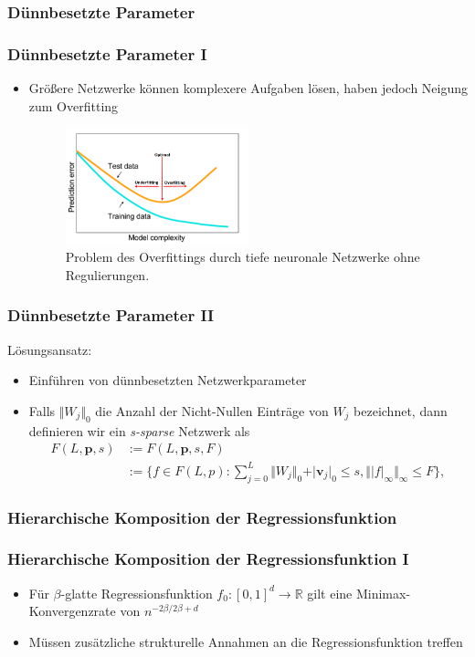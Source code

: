 \documentclass[hyperref={pdfpagelabels=false}]{beamer}
\begin{document}
\subsubsection{Dünnbesetzte Parameter}
\begin{frame}
\frametitle{Dünnbesetzte Parameter \RN{1}}
\begin{itemize}
\item Größere Netzwerke können komplexere Aufgaben lösen, haben jedoch Neigung zum Overfitting \bigskip
\begin{figure}[h]
  \centering
  \includegraphics[width=0.5\textwidth]{Bilder/overfitting.pdf}
  \caption[Caption for LOF]{Problem des Overfittings durch tiefe neuronale Netzwerke ohne Regulierungen.}
\end{figure}
\end{itemize}

\end{frame}

\begin{frame}
\frametitle{Dünnbesetzte Parameter \RN{2}}
Lösungsansatz:
\begin{itemize}
\item Einführen von dünnbesetzten Netzwerkparameter
\item Falls $\Vert W_j \Vert _0$ die Anzahl der Nicht-Nullen Einträge von $W_j$ bezeichnet, dann definieren wir ein \textit{s-sparse} Netzwerk als 
\begin{equation*} 
\begin{split}
F(L,\textbf{p},s) &:= F(L,\textbf{p}, s, F) \\
                 &:= \{ f \in F(L,p): \sum_{j=0}^L \Vert W_j \Vert _0+ \vert \mathbf{v}_j \vert _0\leq s , \Vert \vert f \vert _\infty \Vert _\infty \leq F\}, 
\end{split}
\end{equation*}
\end{itemize}
\end{frame}

\subsubsection{Hierarchische Komposition der Regressionsfunktion}
\begin{frame}
\frametitle{Hierarchische Komposition der Regressionsfunktion \RN{1}}
\begin{itemize}
\item Für $\beta$-glatte Regressionsfunktion $f_0: [0,1]^d \rightarrow \mathbb{R}$ gilt eine Minimax-Konvergenzrate von $n^{-2 \beta /  2\beta + d}$
\item Müssen zusätzliche strukturelle Annahmen an die Regressionsfunktion treffen
\end{itemize}
\end{frame}
\end{document}
